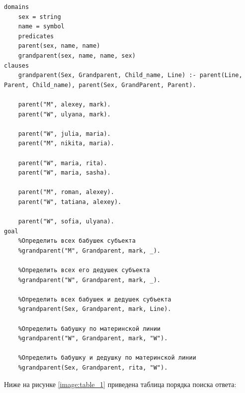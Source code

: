 \begin{lstlisting}[label=lst:code, basicstyle=\footnotesize, caption=Код программы]
domains
	sex = string
	name = symbol
	predicates
	parent(sex, name, name)
	grandparent(sex, name, name, sex)
clauses
	grandparent(Sex, Grandparent, Child_name, Line) :- parent(Line, Parent, Child_name), parent(Sex, GrandParent, Parent).
	
	parent("M", alexey, mark).
	parent("W", ulyana, mark).
	
	parent("W", julia, maria).
	parent("M", nikita, maria).
	
	parent("W", maria, rita).
	parent("W", maria, sasha).
	
	parent("M", roman, alexey).
	parent("W", tatiana, alexey).
	
	parent("W", sofia, ulyana).   
goal
	%Определить всех бабушек субъекта
	%grandparent("M", Grandparent, mark, _).
	
	%Определить всех его дедушек субъекта
	%grandparent("W", Grandparent, mark, _).
	
	%Определить всех бабушек и дедушек субъекта
	%grandparent(Sex, Grandparent, mark, Line).
	
	%Определить бабушку по материнской линии
	%grandparent("W", Grandparent, mark, "W").
	
	%Определить бабушку и дедушку по материнской линии
	%grandparent(Sex, Grandparent, rita, "W").
\end{lstlisting}

Ниже на рисунке \ref{image:table_1} приведена таблица порядка поиска ответа:
\begin{figure}[H]
\end{figure}
